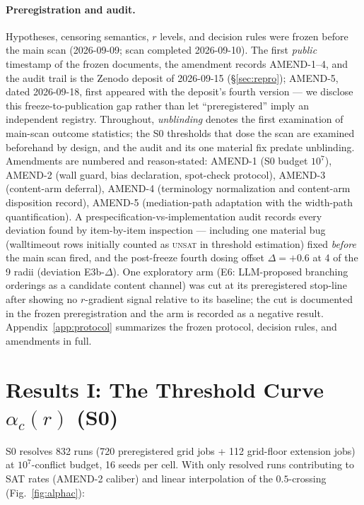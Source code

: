 \documentclass[manuscript, screen, review]{jair}
\newcommand{\ac}[1]{\ensuremath{\alpha_c(#1)}}
\begin{document}
\paragraph{Preregistration and audit.}
Hypotheses, censoring semantics, $r$ levels, and decision rules were frozen
before the main scan (2026-09-09; scan completed 2026-09-10). The first
\emph{public} timestamp of the frozen documents, the amendment records
AMEND-1--4, and the audit trail is the Zenodo deposit of 2026-09-15
(\S\ref{sec:repro}); AMEND-5, dated 2026-09-18, first appeared with the
deposit's fourth version --- we disclose this freeze-to-publication gap rather than let
``preregistered'' imply an independent registry. Throughout,
\emph{unblinding} denotes the first examination of main-scan outcome
statistics; the S0 thresholds that dose the scan are examined beforehand by
design, and the audit and its one material fix predate unblinding.
Amendments are numbered and reason-stated: AMEND-1 (S0
budget $10^7$), AMEND-2 (wall guard, bias declaration, spot-check protocol),
AMEND-3 (content-arm deferral), AMEND-4 (terminology normalization and
content-arm disposition record), AMEND-5 (mediation-path adaptation with the
width-path quantification). A prespecification-vs-implementation audit
records every deviation found by item-by-item inspection --- including one
material bug (walltimeout rows initially counted as \textsc{unsat} in
threshold estimation) fixed \emph{before} the main scan fired, and the
post-freeze fourth dosing offset $\Delta{=}{+}0.6$ at 4 of the 9 radii
(deviation E3b-$\Delta$). One exploratory
arm (E6: LLM-proposed branching orderings as a candidate content channel) was
cut at its preregistered stop-line after showing no $r$-gradient signal
relative to its baseline; the cut is documented in the frozen preregistration
and the arm is recorded as a negative result. Appendix~\ref{app:protocol}
summarizes the frozen protocol, decision rules, and amendments in full.

\section{Results I: The Threshold Curve \texorpdfstring{$\ac{r}$}{alpha\_c(r)} (S0)}
\label{sec:s0}

S0 resolves 832 runs (720 preregistered grid jobs + 112 grid-floor extension
jobs) at $10^7$-conflict budget, 16 seeds per cell. With only resolved runs
contributing to SAT rates (AMEND-2 caliber) and linear interpolation of the
$0.5$-crossing (Fig.~\ref{fig:alphac}):
\end{document}
